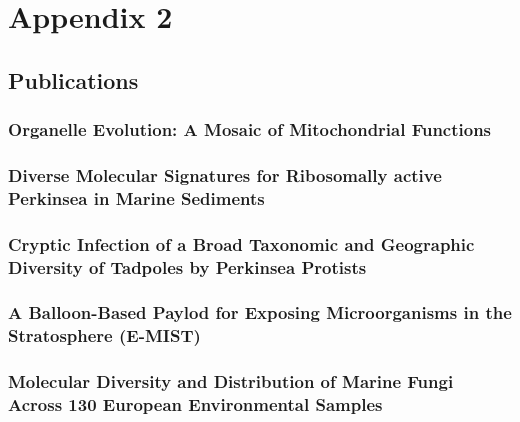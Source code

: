 \graphicspath{{appendices/appendix_2/figures/}}
\chapter{Appendix 2}

\section{Publications}
\noindent
\subsection{Organelle Evolution: A Mosaic of Mitochondrial Functions}
\noindent
\subsection{Diverse Molecular Signatures for Ribosomally active Perkinsea in Marine Sediments}
\noindent
\subsection{Cryptic Infection of a Broad Taxonomic and Geographic Diversity of Tadpoles by Perkinsea Protists}
\noindent
\subsection{A Balloon-Based Paylod for Exposing Microorganisms in the Stratosphere (E-MIST)}
\noindent
\subsection{Molecular Diversity and Distribution of Marine Fungi Across 130 European Environmental Samples}
\noindent
%

